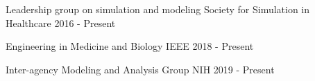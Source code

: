 
\begin{cventries}

  \cventry
    {Leadership group on simulation and modeling} %
    {Society for Simulation in Healthcare} %
    {} %
    {2016 - Present} %
    {
    }

      \cventry
    {Engineering in Medicine and Biology} %
    {IEEE} %
    {} %
    {2018 - Present} %
    {
    }

      \cventry
    {Inter-agency Modeling and Analysis Group } %
    {NIH } %
    {} %
    {2019 - Present} %
    {
    }

\end{cventries}
